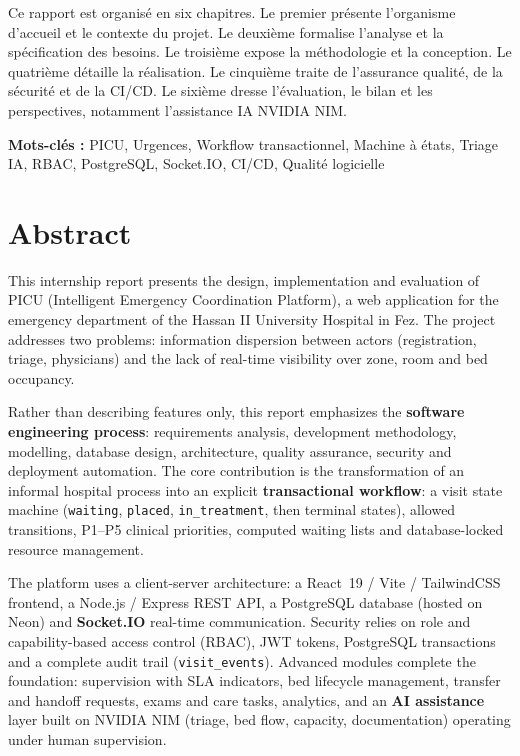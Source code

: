 Ce rapport est organisé en six chapitres. Le premier présente l'organisme d'accueil et le contexte du projet. Le deuxième formalise l'analyse et la spécification des besoins. Le troisième expose la méthodologie et la conception. Le quatrième détaille la réalisation. Le cinquième traite de l'assurance qualité, de la sécurité et de la CI/CD. Le sixième dresse l'évaluation, le bilan et les perspectives, notamment l'assistance IA NVIDIA NIM.

\textbf{Mots-clés :} PICU, Urgences, Workflow transactionnel, Machine à états, Triage IA, RBAC, PostgreSQL, Socket.IO, CI/CD, Qualité logicielle

\chapter*{Abstract}

This internship report presents the design, implementation and evaluation of PICU (Intelligent Emergency Coordination Platform), a web application for the emergency department of the Hassan II University Hospital in Fez. The project addresses two problems: information dispersion between actors (registration, triage, physicians) and the lack of real-time visibility over zone, room and bed occupancy.

Rather than describing features only, this report emphasizes the \textbf{software engineering process}: requirements analysis, development methodology, modelling, database design, architecture, quality assurance, security and deployment automation. The core contribution is the transformation of an informal hospital process into an explicit \textbf{transactional workflow}: a visit state machine (\texttt{waiting}, \texttt{placed}, \texttt{in\_treatment}, then terminal states), allowed transitions, P1--P5 clinical priorities, computed waiting lists and database-locked resource management.

The platform uses a client-server architecture: a React~19 / Vite / TailwindCSS frontend, a Node.js / Express REST API, a PostgreSQL database (hosted on Neon) and \textbf{Socket.IO} real-time communication. Security relies on role and capability-based access control (RBAC), JWT tokens, PostgreSQL transactions and a complete audit trail (\texttt{visit\_events}). Advanced modules complete the foundation: supervision with SLA indicators, bed lifecycle management, transfer and handoff requests, exams and care tasks, analytics, and an \textbf{AI assistance} layer built on NVIDIA NIM (triage, bed flow, capacity, documentation) operating under human supervision.

